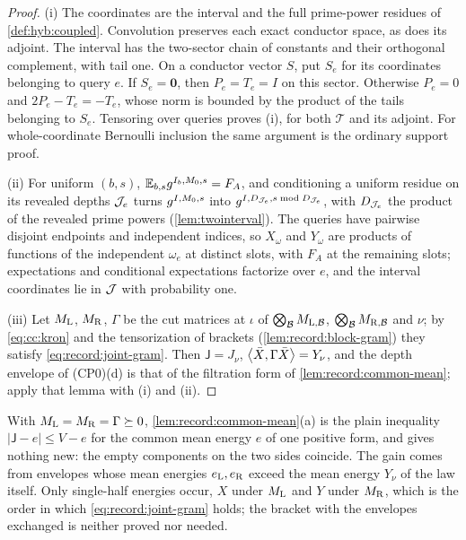 \begin{proof}
(i) The coordinates are the interval and the full prime-power
residues of \cref{def:hyb:coupled}. Convolution preserves each exact
conductor space, as does its adjoint. The interval has the two-sector
chain of constants and their orthogonal complement, with tail one.
On a conductor vector $S$, put $S_e$ for its coordinates belonging to
query $e$. If $S_e=\boldsymbol0$, then $P_e=T_e=I$ on this sector.
Otherwise $P_e=0$ and $2P_e-T_e=-T_e$, whose norm is bounded by the
product of the tails belonging to $S_e$. Tensoring over queries proves
(i), for both $\mathcal T$ and its adjoint. For whole-coordinate
Bernoulli inclusion the same argument is the ordinary support proof.

(ii) For uniform $(b,s)$, $\mathbb E_{b,s}g^{I_b,M_0,s}=F_A$, and conditioning a
uniform residue on its revealed depths $\mathcal J_e$ turns $g^{I,M_0,s}$ into
$g^{I,D_{\mathcal J_e},s\bmod D_{\mathcal J_e}}$, with $D_{\mathcal J_e}$ the product of the
revealed prime powers
(\cref{lem:twointerval}). The queries have pairwise disjoint endpoints and
independent indices, so $X_\omega$ and $Y_\omega$ are products of functions of
the independent $\omega_e$ at distinct slots, with $F_A$ at the remaining
slots; expectations and conditional expectations factorize over $e$, and the
interval coordinates lie in $\mathcal J$ with probability one.

(iii) Let $M_{\rm L}$, $M_{\rm R}$, $\Gamma$ be the cut matrices at $\iota$ of
$\bigotimes_\mathcal B M_{{\rm L},\mathcal B}$, $\bigotimes_\mathcal B M_{{\rm R},\mathcal B}$ and $\nu$;
by \eqref{eq:cc:kron} and the tensorization of brackets
(\cref{lem:record:block-gram}) they satisfy \eqref{eq:record:joint-gram}. Then
$\mathsf J=J_\nu$, $\left\langle \bar X,\Gamma\bar X\right\rangle=Y_\nu$, and the depth envelope of
(CP0)(d) is that of the filtration form of \cref{lem:record:common-mean}; apply that lemma with (i)
and (ii).
\end{proof}

\begin{remark}
With $M_{\rm L}=M_{\rm R}=\Gamma\succeq0$, \cref{lem:record:common-mean}(a) is
the plain inequality $|\mathsf J-e|\le V-e$ for the common mean energy $e$ of
one positive form, and gives nothing new: the empty components on the two
sides coincide. The gain comes from envelopes whose mean energies
$e_{\rm L},e_{\rm R}$ exceed the mean energy $Y_\nu$ of the law itself. Only
single-half energies occur, $X$ under $M_{\rm L}$ and $Y$ under $M_{\rm R}$,
which is the order in which \eqref{eq:record:joint-gram} holds; the bracket
with the envelopes exchanged is neither proved nor needed.
\end{remark}


